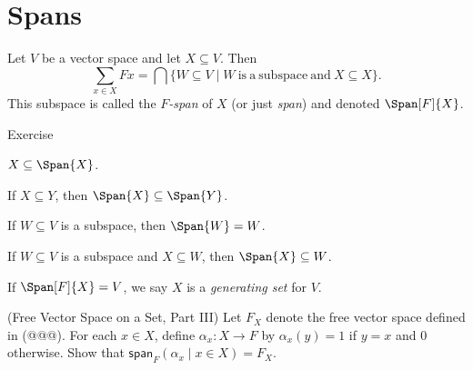 \section{Spans}

\begin{prp}
\label{prp:span-dfn}
Let $V$ be a vector space and let $X \subseteq V$. Then \[\sum_{x \in X} Fx = \bigcap \{ W \subseteq V \mid W\ \mathrm{is\ a\ subspace\ and}\ X \subseteq X \}.\] This subspace is called the \emph{$F$-span} of $X$ (or just \emph{span}) and denoted $\Span[F]{X}$.
\end{prp}

\begin{theproof}
Exercise
\end{theproof}

\begin{prp}
\label{prp:span-basics}
\begin{enumerate*}
\item $X \subseteq \Span{X}$.
\item If $X \subseteq Y$, then $\Span{X} \subseteq \Span{Y}$.
\item If $W \subseteq V$ is a subspace, then $\Span{W} = W$.
\item If $W \subseteq V$ is a subspace and $X \subseteq W$, then $\Span{X} \subseteq W$.
\end{enumerate*}
\end{prp}

\begin{dfn}
If $\Span[F]{X} = V$, we say $X$ is a \emph{generating set} for $V$.
\end{dfn}

\NowForSomeExercises

\begin{exercises}
\item{\label{exr:free-vs-part-iii}}
(Free Vector Space on a Set, Part III) Let $F_X$ denote the free vector space defined in (@@@). For each $x \in X$, define $\alpha_x : X \rightarrow F$ by $\alpha_x(y) = 1$ if $y = x$ and $0$ otherwise. Show that $\mathsf{span}_F(\alpha_x \mid x \in X) = F_X$.
\end{exercises}